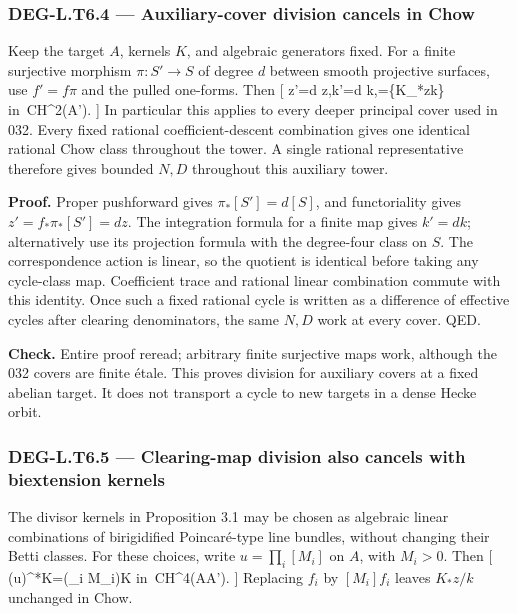 \documentclass[11pt,a4paper]{article}
\theoremstyle{definition}
\begin{document}
\subsubsection{DEG-L.T6.4 --- Auxiliary-cover division cancels in
Chow}\label{deg-l.t6.4-auxiliary-cover-division-cancels-in-chow}

Keep the target \(A\), kernels \(K\), and algebraic generators fixed.
For a finite surjective morphism \(\pi:S'\to S\) of degree \(d\) between
smooth projective surfaces, use \(f'=f\pi\) and the pulled one-forms.
Then {[} z'=d z,\quad k'=d k,=\{K\_*z\over k\}
\quad\hbox{in }CH\^{}2(A')\otimes{}.  {]} In
particular this applies to every deeper principal cover used in 032.
Every fixed rational coefficient-descent combination gives one identical
rational Chow class throughout the tower. A single rational
representative therefore gives bounded \(N,D\) throughout this auxiliary
tower.

\textbf{Proof.} Proper pushforward gives \(\pi_*[S']=d[S]\), and
functoriality gives \(z'=f_*\pi_*[S']=dz\). The integration formula for
a finite map gives \(k'=dk\); alternatively use its projection formula
with the degree-four class on \(S\). The correspondence action is
linear, so the quotient is identical before taking any cycle-class map.
Coefficient trace and rational linear combination commute with this
identity. Once such a fixed rational cycle is written as a difference of
effective cycles after clearing denominators, the same \(N,D\) work at
every cover. QED.

\textbf{Check.} Entire proof reread; arbitrary finite surjective maps
work, although the 032 covers are finite étale. This proves division for
auxiliary covers at a fixed abelian target. It does not transport a
cycle to new targets in a dense Hecke orbit.

\subsubsection{DEG-L.T6.5 --- Clearing-map division also cancels with
biextension
kernels}\label{deg-l.t6.5-clearing-map-division-also-cancels-with-biextension-kernels}

The divisor kernels in Proposition 3.1 may be chosen as algebraic linear
combinations of birigidified Poincaré-type line bundles, without
changing their Betti classes. For these choices, write
\(u=\prod_i[M_i]\) on \(A\), with \(M_i>0\). Then {[}
(u)\^{}*K=\Bigl(\prod\_i M\_i\Bigr)K
\quad\hbox{in }CH\^{}4(A\times A')\otimes{}. {]}
Replacing \(f_i\) by \([M_i]f_i\) leaves \(K_*z/k\) unchanged in Chow.
\end{document}

